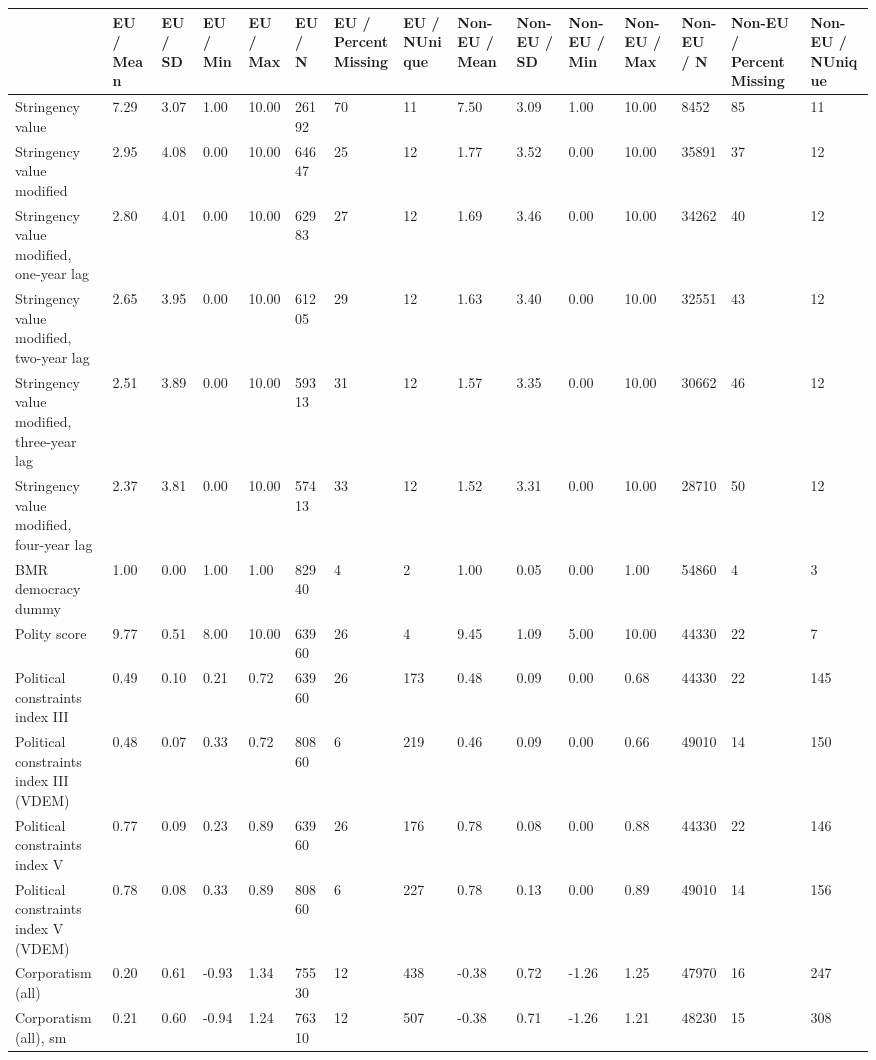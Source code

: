 
\begin{longtable}{lllllllllllllll}
\toprule
  & EU / Mean & EU / SD & EU / Min & EU / Max & EU / N & EU / PercentMissing & EU / NUnique & Non-EU / Mean & Non-EU / SD & Non-EU / Min & Non-EU / Max & Non-EU / N & Non-EU / PercentMissing & Non-EU / NUnique\\
\midrule
Stringency value & 7.29 & 3.07 & 1.00 & 10.00 & 26192 & 70 & 11 & 7.50 & 3.09 & 1.00 & 10.00 & 8452 & 85 & 11\\
Stringency value modified & 2.95 & 4.08 & 0.00 & 10.00 & 64647 & 25 & 12 & 1.77 & 3.52 & 0.00 & 10.00 & 35891 & 37 & 12\\
Stringency value modified, one-year lag & 2.80 & 4.01 & 0.00 & 10.00 & 62983 & 27 & 12 & 1.69 & 3.46 & 0.00 & 10.00 & 34262 & 40 & 12\\
Stringency value modified, two-year lag & 2.65 & 3.95 & 0.00 & 10.00 & 61205 & 29 & 12 & 1.63 & 3.40 & 0.00 & 10.00 & 32551 & 43 & 12\\
Stringency value modified, three-year lag & 2.51 & 3.89 & 0.00 & 10.00 & 59313 & 31 & 12 & 1.57 & 3.35 & 0.00 & 10.00 & 30662 & 46 & 12\\
\addlinespace
Stringency value modified, four-year lag & 2.37 & 3.81 & 0.00 & 10.00 & 57413 & 33 & 12 & 1.52 & 3.31 & 0.00 & 10.00 & 28710 & 50 & 12\\
BMR democracy dummy & 1.00 & 0.00 & 1.00 & 1.00 & 82940 & 4 & 2 & 1.00 & 0.05 & 0.00 & 1.00 & 54860 & 4 & 3\\
Polity score & 9.77 & 0.51 & 8.00 & 10.00 & 63960 & 26 & 4 & 9.45 & 1.09 & 5.00 & 10.00 & 44330 & 22 & 7\\
Political constraints index III & 0.49 & 0.10 & 0.21 & 0.72 & 63960 & 26 & 173 & 0.48 & 0.09 & 0.00 & 0.68 & 44330 & 22 & 145\\
Political constraints index III (VDEM) & 0.48 & 0.07 & 0.33 & 0.72 & 80860 & 6 & 219 & 0.46 & 0.09 & 0.00 & 0.66 & 49010 & 14 & 150\\
\addlinespace
Political constraints index V & 0.77 & 0.09 & 0.23 & 0.89 & 63960 & 26 & 176 & 0.78 & 0.08 & 0.00 & 0.88 & 44330 & 22 & 146\\
Political constraints index V (VDEM) & 0.78 & 0.08 & 0.33 & 0.89 & 80860 & 6 & 227 & 0.78 & 0.13 & 0.00 & 0.89 & 49010 & 14 & 156\\
Corporatism (all) & 0.20 & 0.61 & -0.93 & 1.34 & 75530 & 12 & 438 & -0.38 & 0.72 & -1.26 & 1.25 & 47970 & 16 & 247\\
Corporatism (all), sm & 0.21 & 0.60 & -0.94 & 1.24 & 76310 & 12 & 507 & -0.38 & 0.71 & -1.26 & 1.21 & 48230 & 15 & 308\\

\end{longtable}
